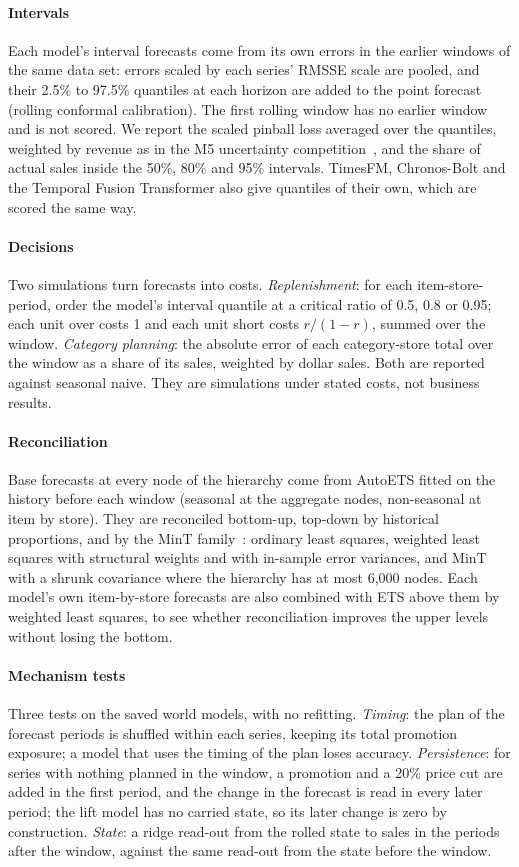 \paragraph{Intervals}
Each model's interval forecasts come from its own errors in the earlier
windows of the same data set: errors scaled by each series' RMSSE scale are
pooled, and their 2.5\% to 97.5\% quantiles at each horizon are added to the
point forecast (rolling conformal calibration). The first rolling window has no
earlier window and is not scored. We report the scaled pinball loss averaged
over the quantiles, weighted by revenue as in the M5 uncertainty
competition~\cite{m5uncertainty}, and the share of actual sales inside the
50\%, 80\% and 95\% intervals. TimesFM, Chronos-Bolt and the Temporal Fusion
Transformer also give quantiles of their own, which are scored the same way.

\paragraph{Decisions}
Two simulations turn forecasts into costs. \emph{Replenishment}: for each
item-store-period, order the model's interval quantile at a critical ratio of
0.5, 0.8 or 0.95; each unit over costs 1 and each unit short costs
$r/(1-r)$, summed over the window. \emph{Category planning}: the absolute error
of each category-store total over the window as a share of its sales, weighted
by dollar sales. Both are reported against seasonal naive. They are
simulations under stated costs, not business results.

\paragraph{Reconciliation}
Base forecasts at every node of the hierarchy come from AutoETS fitted on the
history before each window (seasonal at the aggregate nodes, non-seasonal at
item by store). They are reconciled bottom-up, top-down by historical
proportions, and by the MinT family~\cite{mint}: ordinary least
squares, weighted least squares with structural weights and with in-sample
error variances, and MinT with a shrunk covariance where the hierarchy has at
most 6,000 nodes. Each model's own item-by-store forecasts are also combined
with ETS above them by weighted least squares, to see whether reconciliation
improves the upper levels without losing the bottom.

\paragraph{Mechanism tests}
Three tests on the saved world models, with no refitting. \emph{Timing}: the
plan of the forecast periods is shuffled within each series, keeping its total
promotion exposure; a model that uses the timing of the plan loses accuracy.
\emph{Persistence}: for series with nothing planned in the window, a
promotion and a 20\% price cut are added in the first period, and the change
in the forecast is read in every later period; the lift model has no carried
state, so its later change is zero by construction. \emph{State}: a ridge
read-out from the rolled state to sales in the periods after the window,
against the same read-out from the state before the window.
